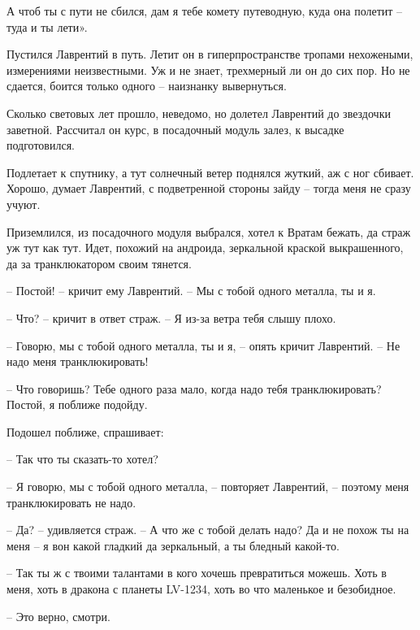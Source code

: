 \documentclass[ebook,oneside,final,openright]{memoir}
\begin{document}
\par
А чтоб ты с пути не сбился, дам я тебе комету путеводную, куда она полетит – туда и ты лети».\par
\par
Пустился Лаврентий в путь. Летит он в гиперпространстве тропами нехожеными, измерениями неизвестными. Уж и не знает, трехмерный ли он до сих пор. Но не сдается, боится только одного – наизнанку вывернуться.\par
\par
Сколько световых лет прошло, неведомо, но долетел Лаврентий до звездочки заветной. Рассчитал он курс, в посадочный модуль залез, к высадке подготовился.\par
\par
Подлетает к спутнику, а тут солнечный ветер поднялся жуткий, аж с ног сбивает. Хорошо, думает Лаврентий, с подветренной стороны зайду – тогда меня не сразу учуют. \par
\par
 Приземлился, из посадочного модуля выбрался, хотел к Вратам бежать, да страж уж тут как тут. Идет, похожий на андроида, зеркальной краской выкрашенного, да за транклюкатором своим тянется. \par
 \par
– Постой! – кричит ему Лаврентий. – Мы с тобой одного металла, ты и я. \par
– Что? – кричит в ответ страж. – Я из-за ветра тебя слышу плохо. \par
– Говорю, мы с тобой одного металла, ты и я, – опять кричит Лаврентий. – Не надо меня транклюкировать!\par
– Что говоришь? Тебе одного раза мало, когда надо тебя транклюкировать? Постой, я поближе подойду. \par
Подошел поближе, спрашивает: \par
– Так что ты сказать-то хотел? \par
– Я говорю, мы с тобой одного металла, – повторяет Лаврентий, – поэтому меня транклюкировать не надо. \par
– Да? – удивляется страж. – А что же с тобой делать надо? Да и не похож ты на меня – я вон какой гладкий да зеркальный, а ты бледный какой-то. \par
– Так ты ж с твоими талантами в кого хочешь превратиться можешь. Хоть в меня, хоть в дракона с планеты LV-1234, хоть во что маленькое и безобидное. \par
– Это верно, смотри. \par
\par
\end{document}
